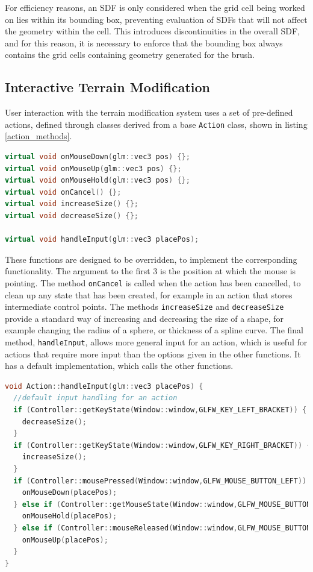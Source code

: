 \documentclass[11pt]{article}
\begin{document}
For efficiency reasons, an SDF is only considered when the grid cell being worked on lies within its bounding box, preventing evaluation of SDFs that will not affect the geometry within the cell. This introduces discontinuities in the overall SDF, and for this reason, it is necessary to enforce that the bounding box always contains the grid cells containing geometry generated for the brush.

\subsection{Interactive Terrain Modification}
User interaction with the terrain modification system uses a set of pre-defined actions, defined through classes derived from a base \texttt{Action} class, shown in listing \ref{action_methods}.

\begin{lstlisting}[language=C++,label={action_methods},caption={Methods of the \texttt{Action} class responsible for handling user interaction.}]
virtual void onMouseDown(glm::vec3 pos) {};
virtual void onMouseUp(glm::vec3 pos) {};
virtual void onMouseHold(glm::vec3 pos) {};
virtual void onCancel() {};
virtual void increaseSize() {};
virtual void decreaseSize() {};

virtual void handleInput(glm::vec3 placePos);
\end{lstlisting}

These functions are designed to be overridden, to implement the corresponding functionality. The argument to the first 3 is the position at which the mouse is pointing. The method \texttt{onCancel} is called when the action has been cancelled, to clean up any state that has been created, for example in an action that stores intermediate control points. The methods \texttt{increaseSize} and \texttt{decreaseSize} provide a standard way of increasing and decreasing the size of a shape, for example changing the radius of a sphere, or thickness of a spline curve. The final method, \texttt{handleInput}, allows more general input for an action, which is useful for actions that require more input than the options given in the other functions. It has a default implementation, which calls the other functions.

\begin{lstlisting}[language=C++,label={action_handleinput},caption={Default implementation of \texttt{handleInput}.}]
void Action::handleInput(glm::vec3 placePos) {
  //default input handling for an action
  if (Controller::getKeyState(Window::window,GLFW_KEY_LEFT_BRACKET)) {
    decreaseSize();
  }
  if (Controller::getKeyState(Window::window,GLFW_KEY_RIGHT_BRACKET)) {
    increaseSize();
  }
  if (Controller::mousePressed(Window::window,GLFW_MOUSE_BUTTON_LEFT)) {
    onMouseDown(placePos);
  } else if (Controller::getMouseState(Window::window,GLFW_MOUSE_BUTTON_LEFT)) {
    onMouseHold(placePos);
  } else if (Controller::mouseReleased(Window::window,GLFW_MOUSE_BUTTON_LEFT)) {
    onMouseUp(placePos);
  }
}
\end{lstlisting}
\end{document}
